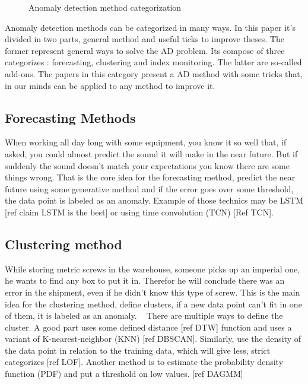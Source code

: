 \documentclass[../../main/main.tex]{subfiles}
\begin{document}
    \begin{figure*}[hp]
        \makebox[\textwidth]{}
        \caption{Anomaly detection method categorization}
    \end{figure*}

    Anomaly detection methods can be categorized in many ways. In this paper it's divided in two parts,
    general method and useful ticks to improve theses. The former represent general ways to 
    solve the AD problem. Its compose of three categorizes : forecasting, clustering and index monitoring.
    The latter are so-called add-ons. The papers in this category present a AD method with some tricks that,
    in our minds can be applied to any method to improve it.
    \subsection{Forecasting Methods}
        When working all day long with some equipment, you know it so well that, if asked, you could almost 
        predict the sound it will make in the near future. But if suddenly the sound doesn't match 
        your expectations you know there are some things wrong.
        That is the core idea for the forecasting method, predict the near future using some generative method
        and if the error goes over some threshold, the data point is labeled as an anomaly. Example of those technics
        may be LSTM [ref claim LSTM is the best] or using time convolution (TCN) [Ref TCN].
    
    \subsection{Clustering method}
        While storing metric screws in the warehouse, someone picks up an imperial one, he wants to find any box to put it in.
        Therefor he will conclude there was an error in the shipment, even if he didn't know this type of screw. This is the main 
        idea for the clustering method, define clusters, if a new data point can't fit in one of them, it is labeled as an anomaly.  
        There are multiple ways to define the cluster. A good part uses some defined distance [ref DTW] function and uses a variant of K-nearest-neighbor (KNN)
        [ref DBSCAN]. Similarly, use the density of the data point in relation to the training data, which will 
        give less, strict categorizes [ref LOF]. Another method is to estimate the probability density function (PDF) 
        and put a threshold on low values. [ref DAGMM]
    
\end{document}
